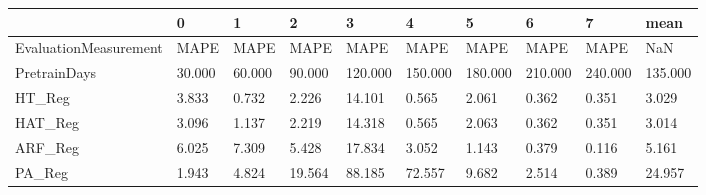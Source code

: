 \begin{tabular}{llllllllll}
\toprule
{} &      0 &      1 &      2 &       3 &       4 &       5 &       6 &       7 &    mean \\
\midrule
EvaluationMeasurement &   MAPE &   MAPE &   MAPE &    MAPE &    MAPE &    MAPE &    MAPE &    MAPE &     NaN \\
PretrainDays          & 30.000 & 60.000 & 90.000 & 120.000 & 150.000 & 180.000 & 210.000 & 240.000 & 135.000 \\
HT\_Reg                &  3.833 &  0.732 &  2.226 &  14.101 &   0.565 &   2.061 &   0.362 &   0.351 &   3.029 \\
HAT\_Reg               &  3.096 &  1.137 &  2.219 &  14.318 &   0.565 &   2.063 &   0.362 &   0.351 &   3.014 \\
ARF\_Reg               &  6.025 &  7.309 &  5.428 &  17.834 &   3.052 &   1.143 &   0.379 &   0.116 &   5.161 \\
PA\_Reg                &  1.943 &  4.824 & 19.564 &  88.185 &  72.557 &   9.682 &   2.514 &   0.389 &  24.957 \\
\bottomrule
\end{tabular}
